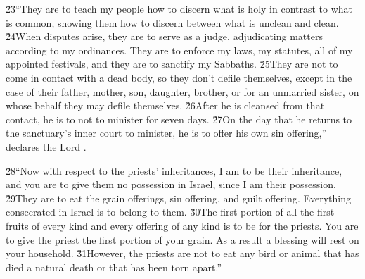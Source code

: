\v{23}``They are to teach my people how to discern what is holy in contrast to what is common, showing them how to discern between what is unclean and clean. \v{24}When disputes arise, they are to serve as a judge, adjudicating matters according to my ordinances. They are to enforce my laws, my statutes, all of my appointed festivals, and they are to sanctify my Sabbaths. \v{25}They are not to come in contact with a dead body, so they don't defile themselves, except in the case of their father, mother, son, daughter, brother, or for an unmarried sister, on whose behalf they may defile themselves. \v{26}After he is cleansed from that contact, he is to not to minister for seven days. \v{27}On the day that he returns to the sanctuary's inner court to minister, he is to offer his own sin offering,'' declares the Lord .

\v{28}``Now with respect to the priests' inheritances, I am to be their inheritance, and you are to give them no possession in Israel, since I am their possession. \v{29}They are to eat the grain offerings, sin offering, and guilt offering. Everything consecrated in Israel is to belong to them. \v{30}The first portion of all the first fruits of every kind and every offering of any kind is to be for the priests. You are to give the priest the first portion of your grain. As a result a blessing will rest on your household. \v{31}However, the priests are not to eat any bird or animal that has died a natural death or that has been torn apart.''

